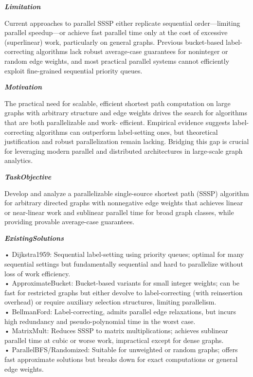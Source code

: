 \begin{tcolorbox}[
    breakable,
    title={Example of Idea Generation in Math},
    colback=LighterGray,
    colframe=DeepPurple,
    colbacktitle=DeepPurple,
    coltitle=White,
]
\textbf{\emph{\textcolor{CaseOrange}{Limitation}}}

Current approaches to parallel SSSP either replicate sequential order—limiting parallel speedup—or
achieve fast parallel time only at the cost of excessive (superlinear) work, particularly on general
graphs. Previous bucket-based label-correcting algorithms lack robust average-case guarantees for
noninteger or random edge weights, and most practical parallel systems cannot efficiently exploit
fine-grained sequential priority queues.

\textbf{\emph{\textcolor{CaseOrange}{Motivation}}}

The practical need for scalable, efficient shortest path computation on large graphs with arbitrary
structure and edge weights drives the search for algorithms that are both parallelizable and work-
efficient. Empirical evidence suggests label-correcting algorithms can outperform label-setting
ones, but theoretical justification and robust parallelization remain lacking. Bridging this gap is
crucial for leveraging modern parallel and distributed architectures in large-scale graph analytics.

\textbf{\emph{\textcolor{CaseOrange}{TaskObjective}}}

Develop and analyze a parallelizable single-source shortest path (SSSP) algorithm for arbitrary
directed graphs with nonnegative edge weights that achieves linear or near-linear work and sublinear
parallel time for broad graph classes, while providing provable average-case guarantees.

\textbf{\emph{\textcolor{CaseOrange}{ExistingSolutions}}}

• Dijkstra1959: Sequential label-setting using priority queues; optimal for many sequential settings but fundamentally sequential and hard to parallelize without loss of work efficiency. \\
• ApproximateBucket: Bucket-based variants for small integer weights; can be fast for restricted graphs but either devolve to label-correcting (with reinsertion overhead) or require auxiliary selection structures, limiting parallelism. \\
• BellmanFord: Label-correcting, admits parallel edge relaxations, but incurs high redundancy and pseudo-polynomial time in the worst case. \\
• MatrixMult: Reduces SSSP to matrix multiplications; achieves sublinear parallel time at cubic or worse work, impractical except for dense graphs. \\
• ParallelBFS/Randomized: Suitable for unweighted or random graphs; offers fast approximate solutions but breaks down for exact computations or general edge weights. 


\end{tcolorbox}
